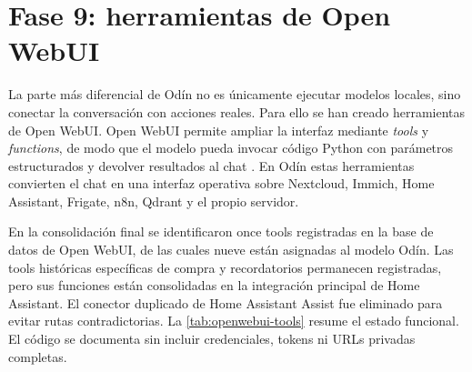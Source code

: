 \section{Fase 9: herramientas de Open WebUI}
La parte más diferencial de Odín no es únicamente ejecutar modelos locales, sino conectar la conversación con acciones reales. Para ello se han creado herramientas de Open WebUI. Open WebUI permite ampliar la interfaz mediante \textit{tools} y \textit{functions}, de modo que el modelo pueda invocar código Python con parámetros estructurados y devolver resultados al chat \citep{openwebuiToolsDocs,openwebuiFunctionsDocs}. En Odín estas herramientas convierten el chat en una interfaz operativa sobre Nextcloud, Immich, Home Assistant, Frigate, n8n, Qdrant y el propio servidor.

En la consolidación final se identificaron once tools registradas en la base de datos de Open WebUI, de las cuales nueve están asignadas al modelo Odín. Las tools históricas específicas de compra y recordatorios permanecen registradas, pero sus funciones están consolidadas en la integración principal de Home Assistant. El conector duplicado de Home Assistant Assist fue eliminado para evitar rutas contradictorias. La \cref{tab:openwebui-tools} resume el estado funcional. El código se documenta sin incluir credenciales, tokens ni URLs privadas completas.


